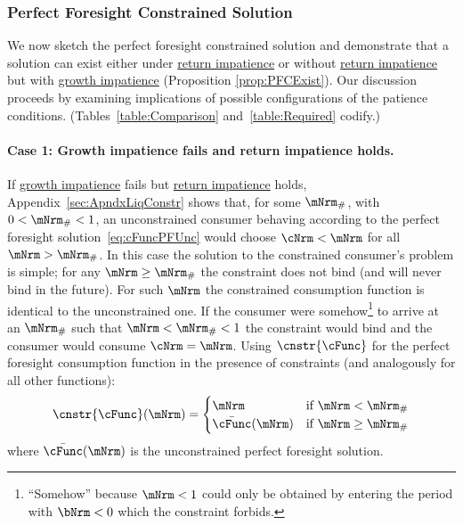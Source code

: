 \documentclass[BufferStockTheory]{subfiles}
\begin{document}
\hypertarget{PF-Constrained-Solution}{}
\hypertarget{Constrained-Solution}{}
\subsubsection{Perfect Foresight Constrained Solution}\label{subsec:PFCon}

We now sketch the perfect foresight constrained solution and demonstrate that a solution can exist either under \hyperlink{RIC}{return impatience} or without \hyperlink{RIC}{return impatience} but with \hyperlink{GIC}{growth impatience} (Proposition \ref{prop:PFCExist}).
Our discussion proceeds by examining implications of possible configurations of the patience conditions.
(Tables~\ref{table:Comparison} and~\ref{table:Required} codify.)


\paragraph{Case 1: Growth impatience fails and return impatience holds.} If \hyperlink{GIC}{growth impatience} fails but \hyperlink{RIC}{return impatience} holds, Appendix~\ref{sec:ApndxLiqConstr} shows that, for some $\mNrm_{\#}$, with $0 < \mNrm_{\#} < 1$, an unconstrained consumer behaving according to the perfect foresight solution~\eqref{eq:cFuncPFUnc} would choose $\cNrm < \mNrm$ for all $\mNrm > \mNrm_{\#}$.
In this case the solution to the constrained consumer's problem is simple; for any $\mNrm \geq \mNrm_{\#}$ the constraint does not bind (and will never bind in the future).
For such $\mNrm$ the constrained consumption function is identical to the unconstrained one.
If the consumer were somehow\footnote{``Somehow'' because $\mNrm<1$ could only be obtained by entering the period with $\bNrm < 0$ which the constraint forbids.} to arrive at an $\mNrm_{\#}$ such that $\mNrm < \mNrm_{\#} < 1$ the constraint would bind and the consumer would consume $\cNrm=\mNrm$.
Using $\cnstr{\cFunc}$ for the perfect foresight consumption function in the presence of constraints  (and analogously for all other functions):
\begin{equation*}
  \cnstr{\cFunc}(\mNrm)=
  \begin{cases}
    \mNrm & \text{if $\mNrm < \mNrm_{\#}$} \\
    \bar{\cFunc}(\mNrm)  & \text{if $\mNrm \geq \mNrm_{\#}$}
  \end{cases}
\end{equation*}
where $\bar{\cFunc}(\mNrm)$ is the unconstrained perfect foresight solution.
\end{document}
